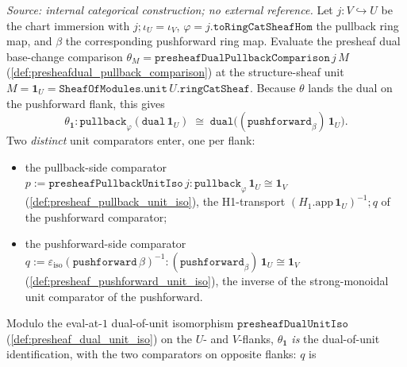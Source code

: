 \begin{lemma}\leanok
  \label{lem:presheafdualunitiso_pullback_natural}
  \textit{Source: internal categorical construction; no external reference.}
  Let \(j : V \hookrightarrow U\) be the chart immersion with \(j \mathbin{;} \iota_U = \iota_V\),
  \(\varphi = j.\mathtt{toRingCatSheafHom}\) the pullback ring map, and \(\beta\) the corresponding
  pushforward ring map. Evaluate the presheaf dual base-change comparison
  \(\theta_M = \mathtt{presheafDualPullbackComparison}\,j\,M\)
  (\cref{def:presheafdual_pullback_comparison}) at the structure-sheaf unit
  \(M = \mathbf 1_U = \mathtt{SheafOfModules.unit}\,U.\mathtt{ringCatSheaf}\). Because \(\theta\) lands
  the dual on the pushforward flank, this gives
  \[
    \theta_{\mathbf 1} : \mathtt{pullback}_\varphi(\mathtt{dual}\,\mathbf 1_U)
      \;\cong\; \mathtt{dual}\bigl((\mathtt{pushforward}_\beta)\,\mathbf 1_U\bigr).
  \]
  Two \emph{distinct} unit comparators enter, one per flank:
  \begin{itemize}
    \item the pullback-side comparator
      \(p := \mathtt{presheafPullbackUnitIso}\,j : \mathtt{pullback}_\varphi\,\mathbf 1_U \cong \mathbf 1_V\)
      (\cref{def:presheaf_pullback_unit_iso}), the H1-transport \((H_1.\mathrm{app}\,\mathbf 1_U)^{-1}
      \mathbin{;} q\) of the pushforward comparator;
    \item the pushforward-side comparator
      \(q := \varepsilon_{\mathrm{iso}}(\mathtt{pushforward}\,\beta)^{-1} :
        (\mathtt{pushforward}_\beta)\,\mathbf 1_U \cong \mathbf 1_V\)
      (\cref{def:presheaf_pushforward_unit_iso}), the inverse of the strong-monoidal unit comparator
      of the pushforward.
  \end{itemize}
  Modulo the eval-at-\(1\) dual-of-unit isomorphism \(\mathtt{presheafDualUnitIso}\)
  (\cref{def:presheaf_dual_unit_iso}) on the \(U\)- and \(V\)-flanks, \(\theta_{\mathbf 1}\)
  \emph{is} the dual-of-unit identification, with the two comparators on opposite flanks: \(q\) is

\end{lemma}

